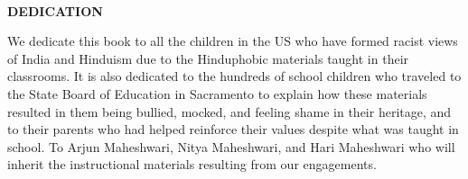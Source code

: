 \thispagestyle{empty}
~
\vfill
\begin{center}
\parbox{0.8\textwidth}{%
\centerline{\textbf{DEDICATION}}
\medskip

We dedicate this book to all the children in the US who have
formed racist views of India and Hinduism due to the Hinduphobic
materials taught in their classrooms.
It is also dedicated to the hundreds of school children who traveled
to the State Board of Education in Sacramento to explain how
these materials resulted in them being bullied, mocked, and feeling
shame in their heritage, and to their parents who had helped
reinforce their values despite what was taught in school.
To Arjun Maheshwari, Nitya Maheshwari, and Hari Maheshwari
who will inherit the instructional materials resulting from our
engagements.}
\end{center}
\vfill
